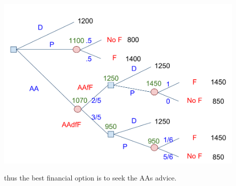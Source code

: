 \documentclass[12pt]{article}
\begin{document}
\begin{enumerate}
\begin{center}
\includegraphics[width=12cm]{Car_Example.pdf}
\end{center}
thus the best financial option is to seek the AAs advice.
\end{enumerate}
\end{document}
